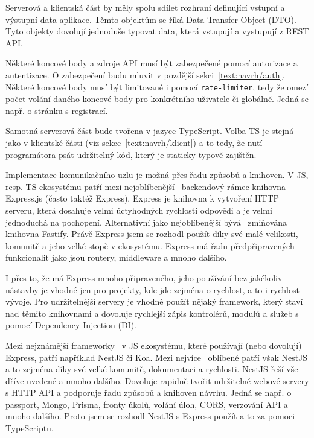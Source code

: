 Serverová a klientská část by měly spolu sdílet rozhraní definující vstupní a výstupní data aplikace.
Těmto objektům se říká Data Transfer Object (DTO).
Tyto objekty dovolují jednoduše typovat data, která vstupují a vystupují z REST API.

Některé koncové body a zdroje API musí být zabezpečené pomocí autorizace a autentizace. 
O zabezpečení budu mluvit v pozdější sekci~\ref{text:navrh/auth}.
Některé koncové body musí být limitované i pomocí \verb|rate-limiter|, tedy že omezí počet volání daného koncové body pro konkrétního uživatele či globálně.
Jedná se např. o stránku s registrací.

Samotná serverová část bude tvořena v jazyce TypeScript.
Volba TS je stejná jako v klientské části (viz sekce~\ref{text:navrh/klient}) a to tedy, že nutí programátora psát udržitelný kód, který je staticky typově zajištěn.

Implementace komunikačního uzlu je možná přes řadu způsobů a knihoven.
V JS, resp. TS ekosystému patří mezi nejoblíbenější~\cite{brown2019web} backendový rámec knihovna Express.js (často taktéž Express).
Express je knihovna k vytvoření HTTP serveru, která dosahuje velmi úctyhodných rychlostí odpovědi a je velmi jednoduchá na pochopení.
Alternativní jako nejoblíbenější bývá~\cite{poreba_2023} zmiňována knihovna Fastify.
Právě Express jsem se rozhodl použít díky své malé velikosti, komunitě a jeho velké stopě v ekosystému.
Express má řadu předpřipravených funkcionalit jako jsou routery, middleware a mnoho dalšího.

I přes to, že má Express mnoho připraveného, jeho používání bez jakékoliv nástavby je vhodné jen pro projekty, kde jde zejména o rychlost, a to i rychlost vývoje.
Pro udržitelnější servery je vhodné použít nějaký framework, který staví nad těmito knihovnami a dovoluje rychlejší zápis kontrolérů, modulů a služeb s pomocí Dependency Injection (DI).

Mezi nejznámější frameworky~\cite{uzayr2022frontend, nest} v JS ekosystému, které používají (nebo dovolují) Express, patří například NestJS či Koa.
Mezi nejvíce~\cite{nest} oblíbené patří však NestJS a to zejména díky své velké komunitě, dokumentaci a rychlosti.
NestJS řeší vše dříve uvedené a mnoho dalšího.
Dovoluje rapidně tvořit udržitelné webové servery s HTTP API a podporuje řadu způsobů a knihoven návrhu.
Jedná se např. o passport, Mongo, Prisma, fronty úkolů, volání úloh, CORS, verzování API a mnoho dalšího.
Proto jsem se rozhodl NestJS s Express použít a to za pomoci TypeScriptu.

